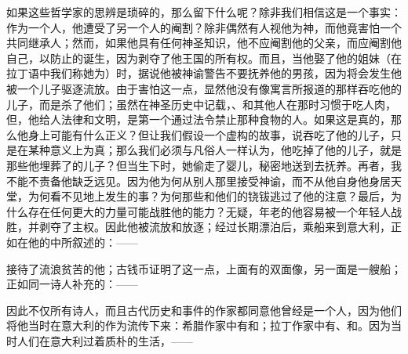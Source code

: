 如果这些哲学家的思辨是琐碎的，那么留下什么呢？除非我们相信这是一个事实：作为一个人，他遭受了另一个人的阉割？除非偶然有人视他为神，而他竟害怕一个共同继承人；然而，如果他具有任何神圣知识，他不应阉割他的父亲，而应阉割他自己，以防止的诞生，因为剥夺了他王国的所有权。而且，当他娶了他的姐妹（在拉丁语中我们称她为）时，据说他被神谕警告不要抚养他的男孩，因为将会发生他被一个儿子驱逐流放。由于害怕这一点，显然他没有像寓言所报道的那样吞吃他的儿子，而是杀了他们；虽然在神圣历史中记载，、和其他人在那时习惯于吃人肉，但，他给人法律和文明，是第一个通过法令禁止那种食物的人。如果这是真的，那么他身上可能有什么正义？但让我们假设一个虚构的故事，说吞吃了他的儿子，只是在某种意义上为真；那么我们必须与凡俗人一样认为，他吃掉了他的儿子，就是那些他埋葬了的儿子？但当生下时，她偷走了婴儿，秘密地送到去抚养。再者，我不能不责备他缺乏远见。因为他为何从别人那里接受神谕，而不从他自身他身居天堂，为何看不见地上发生的事？为何那些和他们的铙钹逃过了他的注意？最后，为什么存在任何更大的力量可能战胜他的能力？无疑，年老的他容易被一个年轻人战胜，并剥夺了主权。因此他被流放和放逐；经过长期漂泊后，乘船来到意大利，正如在他的中所叙述的：——\par

\par

接待了流浪贫苦的他；古钱币证明了这一点，上面有的双面像，另一面是一艘船；正如同一诗人补充的：——\par

\par

因此不仅所有诗人，而且古代历史和事件的作家都同意他曾经是一个人，因为他们将他当时在意大利的作为流传下来：希腊作家中有和；拉丁作家中有、和。因为当时人们在意大利过着质朴的生活，——\par

\par

